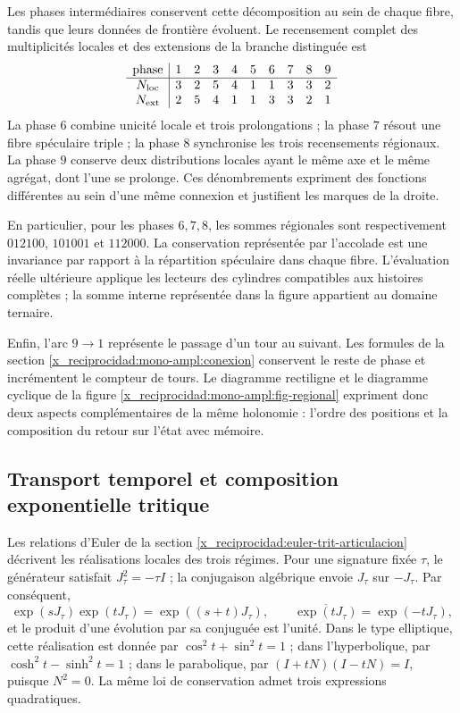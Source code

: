 Les phases intermédiaires conservent cette décomposition au sein de chaque fibre,
tandis que leurs données de frontière évoluent. Le recensement complet des
multiplicités locales et des extensions de la branche distinguée est
\[
\begin{array}{c|rrrrrrrrr}
\text{phase}&1&2&3&4&5&6&7&8&9\\\hline
N_{\rm loc}&3&2&5&4&1&1&3&3&2\\
N_{\rm ext}&2&5&4&1&1&3&3&2&1
\end{array}
\]
La phase \(6\) combine unicité locale et trois prolongations ; la phase
\(7\) résout une fibre spéculaire triple ; la phase \(8\) synchronise
les trois recensements régionaux. La phase \(9\) conserve deux distributions
locales ayant le même axe et le même agrégat, dont l'une se
prolonge. Ces dénombrements expriment des fonctions différentes au sein d'une
même connexion et justifient les marques de la droite.

En particulier, pour les phases \(6,7,8\), les sommes régionales sont
respectivement \(012100\), \(101001\) et \(112000\). La conservation
représentée par l'accolade est une invariance par rapport à la répartition
spéculaire dans chaque fibre. L'évaluation réelle ultérieure applique les
lecteurs des cylindres compatibles aux histoires complètes ; la
somme interne représentée dans la figure appartient au domaine ternaire.

Enfin, l'arc \(9\to1\) représente le passage d'un tour au suivant. Les formules de la section \ref{x_reciprocidad:mono-ampl:conexion} conservent le reste de phase et incrémentent le compteur de tours. Le diagramme rectiligne et le diagramme cyclique de la figure \ref{x_reciprocidad:mono-ampl:fig-regional} expriment donc deux aspects complémentaires de la même holonomie : l'ordre des positions et la composition du retour sur l'état avec mémoire.



\subsection{Transport temporel et composition exponentielle tritique}
\label{x_reciprocidad:mono-ampl:euler}

Les relations d'Euler de la section \ref{x_reciprocidad:euler-trit-articulacion}
décrivent les réalisations locales des trois régimes. Pour une signature
fixée \(\tau\), le générateur satisfait \(J_\tau^2=-\tau I\) ;
la conjugaison algébrique envoie \(J_\tau\) sur \(-J_\tau\). Par conséquent,
\[
 \exp(sJ_\tau)\exp(tJ_\tau)=\exp((s+t)J_\tau),\qquad
 \overline{\exp(tJ_\tau)}=\exp(-tJ_\tau),
\]
et le produit d'une évolution par sa conjuguée est l'unité. Dans le type
elliptique, cette réalisation est donnée par \(\cos^2t+\sin^2t=1\) ; dans l'hyperbolique,
par \(\cosh^2t-\sinh^2t=1\) ; dans le parabolique,
par \((I+tN)(I-tN)=I\), puisque \(N^2=0\). La même loi de conservation
admet trois expressions quadratiques.

